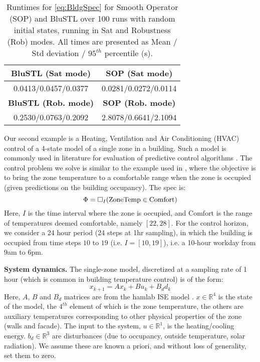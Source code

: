 \begin{table}[t]
	\begin{center}
		\caption{{\small Runtimes for \eqref{eq:BldgSpec} for Smooth Operator (SOP) and BluSTL over 100 runs with random initial states, running in Sat and Robustness (Rob) modes. All times are presented as Mean / Std deviation / $95^{th}$ percentile (s)}.}
		\vspace{-5pt}
		\label{tbl:bldg}
		\begin{tabular} {|c|c|}
			\hline
			\textbf{BluSTL (Sat mode)} &   \textbf{SOP (Sat mode)}
			\\ \hline
			0.0413/0.0457/0.0377 & 0.0281/0.0272/0.0114
			\\ \hline
			 \textbf{BluSTL (Rob. mode)} & \textbf{SOP (Rob. mode)}
			\\ \hline
			 0.2530/0.0763/0.2092 & 2.8078/0.6641/2.1094\\ \hline	
		\end{tabular}	
	\end{center}
	\vspace{-10pt}
\end{table}
Our second example is a Heating, Ventilation and Air Conditioning (HVAC) control of a 4-state model of a single zone in a building. 
Such a model is commonly used in literature for evaluation of predictive control algorithms \cite{Jain2016}. 
The control problem we solve is similar to the example used in \cite{Raman14_MPCSTL}, where the objective is to bring the zone temperature to a comfortable range when the zone is occupied (given predictions on the building occupancy). 
The spec is:
\begin{equation}
\label{eq:BldgSpec}
\Phi= \square_I(\text{ZoneTemp} \in \text{Comfort})
\end{equation}
Here, $I$ is the time interval where the zone is occupied, and $\text{Comfort}$ is the range of temperatures deemed comfortable, namely $[22,28]$. For the control horizon, we consider a 24 hour period (24 steps at 1hr sampling), in which the building is occupied from time steps $10$ to $19$ (i.e. $I=[10,19]$), i.e. a 10-hour workday from 9am to 6pm. 

\textbf{System dynamics.} The single-zone model, discretized at a sampling rate of 1 hour (which is common in building temperature control) is of the form:
\begin{equation}
\label{eq:bldg_dyn}
x_{k+1} = Ax_{k}+Bu_k+B_dd_k
\end{equation}
Here, $A$, $B$ and $B_d$ matrices are from the hamlab ISE model \cite{VanSchijndel2005}. $x \in \mathbb{R}^4$ is the state of the model, the $4^{th}$ element of which is the zone temperature, the others are auxiliary temperatures corresponding to other physical properties of the zone (walls and facade). 
The input to the system, $u \in \mathbb{R}^1$, is the heating/cooling energy. 
$b_d \in \mathbb{R}^3$ are disturbances (due to occupancy, outside temperature, solar radiation). 
We assume these are known a priori, and without loss of generality, set them to zero.

